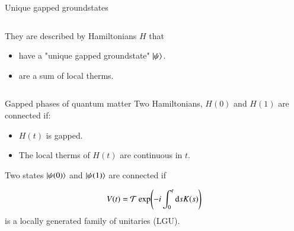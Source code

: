 \documentclass{beamer}
\begin{document}
\begin{frame}{Unique gapped groundstates}
	\begin{columns}
		\begin{column}{0.7\textwidth}
			They are described by Hamiltonians $H$ that
			\begin{itemize}
				\item<2-> have a "unique gapped groundstate" $\ket{\psi}$.
				\item<3-> are a sum of local therms.
			\end{itemize}
		\end{column}
		\begin{column}{0.3\textwidth}
			\begin{center}
				
			\end{center}
		\end{column}
	\end{columns}
	
\end{frame}

\begin{frame}{Gapped phases of quantum matter}
	Two Hamiltonians, $H(0)$ and $H(1)$ are connected if:
	\begin{center}
	\end{center}
	\begin{itemize}
		\item<2-> $H(t)$ is gapped.
		\item<3-> The local therms of $H(t)$ are continuous in $t$.
	\end{itemize}
	
\end{frame}

\begin{frame}
	Two states $\ket{\psi(0)}$ and $\ket{\psi(1)}$ are connected if
	\begin{center}
	\end{center}
	\[V(t)=\mathcal{T}\exp(-i\int_0^t \textrm{d} s K(s))\]
	is a locally generated family of unitaries (LGU).
\end{frame}
\end{document}
